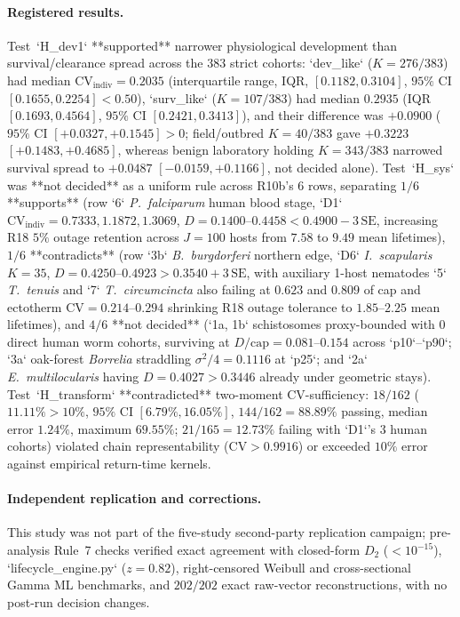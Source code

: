 \paragraph{Registered results.}
Test~`H\_dev1` **supported** narrower physiological development than survival/clearance spread across the $383$ strict cohorts: `dev\_like` ($K = 276/383$) had median $\mathrm{CV}_{\mathrm{indiv}} = 0.2035$ (interquartile range, IQR, $[0.1182, 0.3104]$, $95\%$ CI $[0.1655, 0.2254] < 0.50$), `surv\_like` ($K = 107/383$) had median $0.2935$ (IQR $[0.1693, 0.4564]$, $95\%$ CI $[0.2421, 0.3413]$), and their difference was $+0.0900$ ($95\%$ CI $[+0.0327, +0.1545] > 0$; field/outbred $K = 40/383$ gave $+0.3223$ $[+0.1483, +0.4685]$, whereas benign laboratory holding $K = 343/383$ narrowed survival spread to $+0.0487$ $[-0.0159, +0.1166]$, not decided alone). Test~`H\_sys` was **not decided** as a uniform rule across R10b's $6$ rows, separating $1/6$ **supports** (row `6` \textit{P.~falciparum} human blood stage, `D1` $\mathrm{CV}_{\mathrm{indiv}} = 0.7333, 1.1872, 1.3069$, $D = 0.1400$--$0.4458 < 0.4900 - 3\,\mathrm{SE}$, increasing R18 $5\%$ outage retention across $J = 100$ hosts from $7.58$ to $9.49$ mean lifetimes), $1/6$ **contradicts** (row `3b` \textit{B.~burgdorferi} northern edge, `D6` \textit{I.~scapularis} $K = 35$, $D = 0.4250$--$0.4923 > 0.3540 + 3\,\mathrm{SE}$, with auxiliary 1-host nematodes `5` \textit{T.~tenuis} and `7` \textit{T.~circumcincta} also failing at $0.623$ and $0.809$ of cap and ectotherm $\mathrm{CV} = 0.214$--$0.294$ shrinking R18 outage tolerance to $1.85$--$2.25$ mean lifetimes), and $4/6$ **not decided** (`1a, 1b` schistosomes proxy-bounded with $0$ direct human worm cohorts, surviving at $D/\mathrm{cap} = 0.081$--$0.154$ across `p10`--`p90`; `3a` oak-forest \textit{Borrelia} straddling $\sigma^2/4 = 0.1116$ at `p25`; and `2a` \textit{E.~multilocularis} having $D = 0.4027 > 0.3446$ already under geometric stays). Test~`H\_transform` **contradicted** two-moment CV-sufficiency: $18/162$ ($11.11\% > 10\%$, $95\%$ CI $[6.79\%, 16.05\%]$, $144/162 = 88.89\%$ passing, median error $1.24\%$, maximum $69.55\%$; $21/165 = 12.73\%$ failing with `D1`'s $3$ human cohorts) violated chain representability ($\mathrm{CV} > 0.9916$) or exceeded $10\%$ error against empirical return-time kernels.

\paragraph{Independent replication and corrections.}
This study was not part of the five-study second-party replication campaign; pre-analysis Rule~7 checks verified exact agreement with closed-form $D_2$ ($< 10^{-15}$), `lifecycle\_engine.py` ($z = 0.82$), right-censored Weibull and cross-sectional Gamma ML benchmarks, and $202/202$ exact raw-vector reconstructions, with no post-run decision changes.

